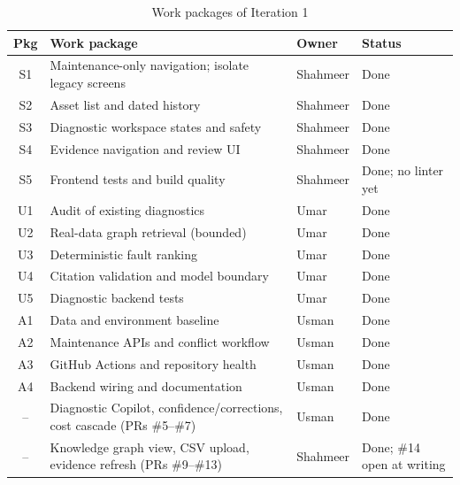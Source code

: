 \begin{table}[H]
\centering
\caption{Work packages of Iteration 1}
\label{tab:work-packages}
\small
\begin{tabularx}{\textwidth}{@{}c L >{\raggedright\arraybackslash}p{0.16\textwidth} >{\raggedright\arraybackslash}p{0.16\textwidth}@{}}
\toprule
Pkg & Work package & Owner & Status \\
\midrule
S1 & Maintenance-only navigation; isolate legacy screens & Shahmeer & Done \\
S2 & Asset list and dated history & Shahmeer & Done \\
S3 & Diagnostic workspace states and safety & Shahmeer & Done \\
S4 & Evidence navigation and review UI & Shahmeer & Done \\
S5 & Frontend tests and build quality & Shahmeer & Done; no linter yet \\
U1 & Audit of existing diagnostics & Umar & Done \\
U2 & Real-data graph retrieval (bounded) & Umar & Done \\
U3 & Deterministic fault ranking & Umar & Done \\
U4 & Citation validation and model boundary & Umar & Done \\
U5 & Diagnostic backend tests & Umar & Done \\
A1 & Data and environment baseline & Usman & Done \\
A2 & Maintenance APIs and conflict workflow & Usman & Done \\
A3 & GitHub Actions and repository health & Usman & Done \\
A4 & Backend wiring and documentation & Usman & Done \\
-- & Diagnostic Copilot, confidence/corrections, cost cascade (PRs \#5--\#7) & Usman & Done \\
-- & Knowledge graph view, CSV upload, evidence refresh (PRs \#9--\#13) & Shahmeer & Done; \#14 open at writing \\
\bottomrule
\end{tabularx}
\end{table}
